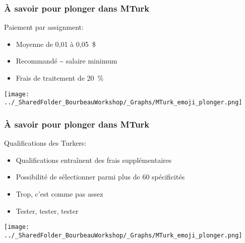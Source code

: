 \documentclass{beamer}
\begin{document}

    \begin{frame}
    
      \frametitle{À savoir pour plonger dans MTurk} \vspace{1cm}
      
      Paiement par assignment:
       \begin{itemize}
          \item{Moyenne de 0,01 à 0,05~\$}
          \item{Recommandé \~{} salaire minimum}
          \item{Frais de traitement de 20~\%}
        \end{itemize}
  
   \begin{flushright}
     	    \texttt{[image: ../\_SharedFolder\_BourbeauWorkshop/\_Graphs/MTurk\_emoji\_plonger.png]}
    \end{flushright} 
         
    \end{frame}  
    
    

    \begin{frame}
    
      \frametitle{À savoir pour plonger dans MTurk} \vspace{1cm}
      
      Qualifications des Turkers:
       \begin{itemize}
          \item{Qualifications entraînent des frais supplémentaires}
          \item{Possibilité de sélectionner parmi plus de 60 spécificités}
          \item{Trop, c'est comme pas assez}
          \item{Tester, tester, tester}
        \end{itemize}
   
   \begin{flushright}
     	    \texttt{[image: ../\_SharedFolder\_BourbeauWorkshop/\_Graphs/MTurk\_emoji\_plonger.png]}
    \end{flushright} 
         
    \end{frame}  
    
\end{document}
